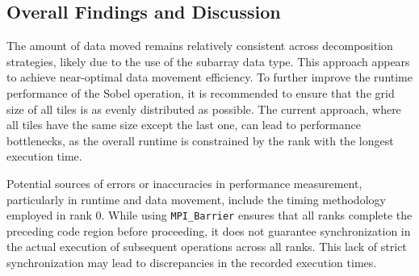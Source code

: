 \subsection{Overall Findings and Discussion}
\label{subsec:overall-findings-and-discussion}

The amount of data moved remains relatively consistent across decomposition strategies, likely due to the use of the subarray data type. This approach appears to achieve near-optimal data movement efficiency. To further improve the runtime performance of the Sobel operation, it is recommended to ensure that the grid size of all tiles is as evenly distributed as possible. The current approach, where all tiles have the same size except the last one, can lead to performance bottlenecks, as the overall runtime is constrained by the rank with the longest execution time.

Potential sources of errors or inaccuracies in performance measurement, particularly in runtime and data movement, include the timing methodology employed in rank 0. While using \texttt{MPI\_Barrier} ensures that all ranks complete the preceding code region before proceeding, it does not guarantee synchronization in the actual execution of subsequent operations across all ranks. This lack of strict synchronization may lead to discrepancies in the recorded execution times.

